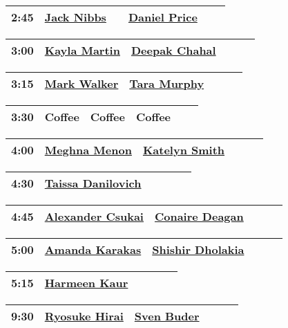 \documentclass{article}
\begin{document}
\begin{longtable}{|c | c | c | c | c | c|}
\hline
2:45 & \href{speakers/jack-nibbs/_index.md}{Jack Nibbs} &  & \href{speakers/daniel-price/_index.md}{Daniel Price} \\
\hline
\end{longtable}
\begin{longtable}{|c | c | c | c | c | c|}
\hline
3:00 & \href{speakers/kayla-martin/_index.md}{Kayla Martin} & \href{speakers/deepak-chahal/_index.md}{Deepak Chahal} &  \\
\hline
\end{longtable}
\begin{longtable}{|c | c | c | c | c | c|}
\hline
3:15 & \href{speakers/mark-walker/_index.md}{Mark Walker} & \href{speakers/tara-murphy/_index.md}{Tara Murphy} &  \\
\hline
\end{longtable}
\begin{longtable}{|c | c | c | c | c | c|}
\hline
3:30 & Coffee & Coffee & Coffee \\
\hline
\end{longtable}
\begin{longtable}{|c | c | c | c | c | c|}
\hline
4:00 & \href{speakers/meghna-menon/_index.md}{Meghna Menon} & \href{speakers/katelyn-smith/_index.md}{Katelyn Smith} &  \\
\hline
\end{longtable}
\begin{longtable}{|c | c | c | c | c | c|}
\hline
4:30 & \href{speakers/taissa-danilovich/_index.md}{Taissa Danilovich} &  &  \\
\hline
\end{longtable}
\begin{longtable}{|c | c | c | c | c | c|}
\hline
4:45 & \href{speakers/alexander-csukai/_index.md}{Alexander Csukai} & \href{speakers/conaire-deagan/_index.md}{Conaire Deagan} &  \\
\hline
\end{longtable}
\begin{longtable}{|c | c | c | c | c | c|}
\hline
5:00 & \href{speakers/amanda-karakas/_index.md}{Amanda Karakas} & \href{speakers/shishir-dholakia/_index.md}{Shishir Dholakia} &  \\
\hline
\end{longtable}
\begin{longtable}{|c | c | c | c | c | c|}
\hline
5:15 & \href{speakers/harmeen-kaur/_index.md}{Harmeen Kaur} &  &  \\
\hline
\end{longtable}
\begin{longtable}{|c | c | c | c | c | c|}
\hline
9:30 & \href{speakers/ryosuke-hirai/_index.md}{Ryosuke Hirai} & \href{speakers/sven-buder/_index.md}{Sven Buder} &  \\
\hline
\end{longtable}
\end{document}
